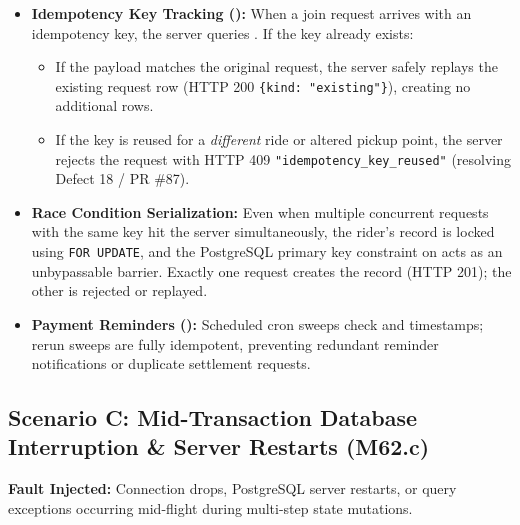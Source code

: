 \documentclass[10pt]{article}
\begin{document}
\begin{itemize}
  \item \textbf{Idempotency Key Tracking ():} When a join request arrives with an idempotency key, the server queries . If the key already exists:
    \begin{itemize}
      \item If the payload matches the original request, the server safely replays the existing request row (HTTP 200 \texttt{\{kind: "existing"\}}), creating no additional rows.
      \item If the key is reused for a \emph{different} ride or altered pickup point, the server rejects the request with HTTP 409 \texttt{"idempotency\_key\_reused"} (resolving Defect 18 / PR \#87).
    \end{itemize}
  \item \textbf{Race Condition Serialization:} Even when multiple concurrent requests with the same key hit the server simultaneously, the rider's record is locked using \texttt{FOR UPDATE}, and the PostgreSQL primary key constraint on  acts as an unbypassable barrier. Exactly one request creates the record (HTTP 201); the other is rejected or replayed.
  \item \textbf{Payment Reminders ():} Scheduled cron sweeps check  and  timestamps; rerun sweeps are fully idempotent, preventing redundant reminder notifications or duplicate settlement requests.
\end{itemize}

\subsection{Scenario C: Mid-Transaction Database Interruption \& Server Restarts (M62.c)}
\textbf{Fault Injected:} Connection drops, PostgreSQL server restarts, or query exceptions occurring mid-flight during multi-step state mutations.
\end{document}
